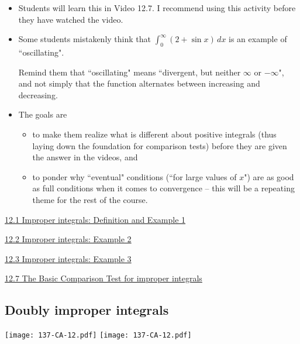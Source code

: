 \documentclass[11pt]{article}
\newcommand {\DS} [1] {${\displaystyle #1}$}
\newcommand{\nl}{\hfill \vspace{-1.1\baselineskip}} %
\newcommand{\vi}{\hspace{8mm} \href{https://www.youtube.com/watch?v=NqxwJ2D-Ckc&list=PLlwePzQY_wW-OVbBuwbFDl8RB5kt2Tngo}{12.1 Improper integrals: Definition and Example 1}}
\newcommand{\vii}{\hspace{8mm} \href{https://www.youtube.com/watch?v=L9wxtktioik&list=PLlwePzQY_wW-OVbBuwbFDl8RB5kt2Tngo&index=2}{12.2 Improper integrals: Example 2}}
\newcommand{\viii}{\hspace{8mm} \href{https://www.youtube.com/watch?v=pbr8GWBmLhU&list=PLlwePzQY_wW-OVbBuwbFDl8RB5kt2Tngo&index=3}{12.3 Improper integrals: Example 3}}
\newcommand{\vvii}{\hspace{8mm} \href{https://www.youtube.com/watch?v=8xtCdrLzQpQ&list=PLlwePzQY_wW-OVbBuwbFDl8RB5kt2Tngo&index=7}{12.7 The Basic Comparison Test for improper integrals}}
\begin{document}
\begin{comments}
\nl
	\begin{itemize}
		\item Students will learn this in Video 12.7.  I recommend using this activity before they have watched the video.  
		\item   Some students mistakenly think that \DS{\int_0^{\infty} (2 + \sin x) \, dx} is an example of   ``oscillating".
		
		Remind them that ``oscillating" means ``divergent, but neither $\infty$ or $-\infty$", and not simply that the function alternates between increasing and decreasing.

		\item The goals are
			\begin{itemize}
				\item to make them realize what is different about positive integrals (thus laying down the foundation for comparison tests) before they are given the answer in the videos, and 
				\item to ponder why ``eventual" conditions (``for large values of $x$") are as good as full conditions when it comes to convergence -- this will be a repeating theme for the rest of the course.
			\end{itemize}
	\end{itemize}
\end{comments}

\begin{videos}
\vi

\vii

\viii

\vvii
\end{videos}

\newpage
\subsection{Doubly improper integrals}

\begin{center}
{ \texttt{[image: 137-CA-12.pdf]}} \quad
{ \texttt{[image: 137-CA-12.pdf]}} 
\end{center}
\end{document}
